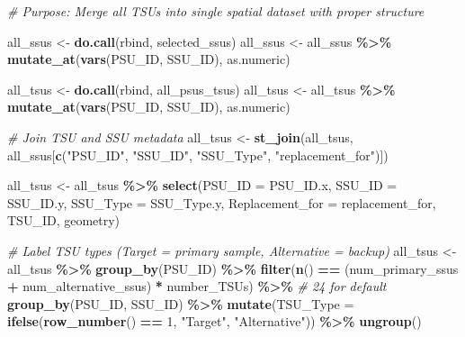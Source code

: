 \documentclass[
  10pt,
  b5paper,
  oneside]{book}
\newenvironment{Shaded}{\begin{snugshade}}{\end{snugshade}}
\newcommand{\AttributeTok}[1]{\textcolor[rgb]{0.13,0.29,0.53}{#1}}
\newcommand{\CommentTok}[1]{\textcolor[rgb]{0.56,0.35,0.01}{\textit{#1}}}
\newcommand{\DecValTok}[1]{\textcolor[rgb]{0.00,0.00,0.81}{#1}}
\newcommand{\FunctionTok}[1]{\textcolor[rgb]{0.13,0.29,0.53}{\textbf{#1}}}
\newcommand{\NormalTok}[1]{#1}
\newcommand{\OtherTok}[1]{\textcolor[rgb]{0.56,0.35,0.01}{#1}}
\newcommand{\SpecialCharTok}[1]{\textcolor[rgb]{0.81,0.36,0.00}{\textbf{#1}}}
\newcommand{\StringTok}[1]{\textcolor[rgb]{0.31,0.60,0.02}{#1}}
\begin{document}
\begin{Shaded}
\begin{Highlighting}[]
\CommentTok{\# Purpose: Merge all TSUs into single spatial dataset with proper structure}

\NormalTok{all\_ssus }\OtherTok{\textless{}{-}} \FunctionTok{do.call}\NormalTok{(rbind, selected\_ssus)}
\NormalTok{all\_ssus }\OtherTok{\textless{}{-}}\NormalTok{ all\_ssus }\SpecialCharTok{\%\textgreater{}\%} \FunctionTok{mutate\_at}\NormalTok{(}\FunctionTok{vars}\NormalTok{(PSU\_ID, SSU\_ID), as.numeric)}

\NormalTok{all\_tsus }\OtherTok{\textless{}{-}} \FunctionTok{do.call}\NormalTok{(rbind, all\_psus\_tsus)}
\NormalTok{all\_tsus }\OtherTok{\textless{}{-}}\NormalTok{ all\_tsus }\SpecialCharTok{\%\textgreater{}\%} \FunctionTok{mutate\_at}\NormalTok{(}\FunctionTok{vars}\NormalTok{(PSU\_ID, SSU\_ID), as.numeric)}

\CommentTok{\# Join TSU and SSU metadata}
\NormalTok{all\_tsus }\OtherTok{\textless{}{-}} \FunctionTok{st\_join}\NormalTok{(all\_tsus, all\_ssus[}\FunctionTok{c}\NormalTok{(}\StringTok{"PSU\_ID"}\NormalTok{, }\StringTok{"SSU\_ID"}\NormalTok{, }\StringTok{"SSU\_Type"}\NormalTok{, }\StringTok{"replacement\_for"}\NormalTok{)])}

\NormalTok{all\_tsus }\OtherTok{\textless{}{-}}\NormalTok{ all\_tsus }\SpecialCharTok{\%\textgreater{}\%}
  \FunctionTok{select}\NormalTok{(}\AttributeTok{PSU\_ID =}\NormalTok{ PSU\_ID.x, }\AttributeTok{SSU\_ID =}\NormalTok{ SSU\_ID.y, }\AttributeTok{SSU\_Type =}\NormalTok{ SSU\_Type.y,}
         \AttributeTok{Replacement\_for =}\NormalTok{ replacement\_for, TSU\_ID, geometry)}

\CommentTok{\# Label TSU types (Target = primary sample, Alternative = backup)}
\NormalTok{all\_tsus }\OtherTok{\textless{}{-}}\NormalTok{ all\_tsus }\SpecialCharTok{\%\textgreater{}\%}
  \FunctionTok{group\_by}\NormalTok{(PSU\_ID) }\SpecialCharTok{\%\textgreater{}\%}
  \FunctionTok{filter}\NormalTok{(}\FunctionTok{n}\NormalTok{() }\SpecialCharTok{==}\NormalTok{ (num\_primary\_ssus }\SpecialCharTok{+}\NormalTok{ num\_alternative\_ssus) }\SpecialCharTok{*}\NormalTok{ number\_TSUs) }\SpecialCharTok{\%\textgreater{}\%}  \CommentTok{\# 24 for default}
  \FunctionTok{group\_by}\NormalTok{(PSU\_ID, SSU\_ID) }\SpecialCharTok{\%\textgreater{}\%}
  \FunctionTok{mutate}\NormalTok{(}\AttributeTok{TSU\_Type =} \FunctionTok{ifelse}\NormalTok{(}\FunctionTok{row\_number}\NormalTok{() }\SpecialCharTok{==} \DecValTok{1}\NormalTok{, }\StringTok{"Target"}\NormalTok{, }\StringTok{"Alternative"}\NormalTok{)) }\SpecialCharTok{\%\textgreater{}\%}
  \FunctionTok{ungroup}\NormalTok{()}


\end{Highlighting}
\end{Shaded}
\end{document}
